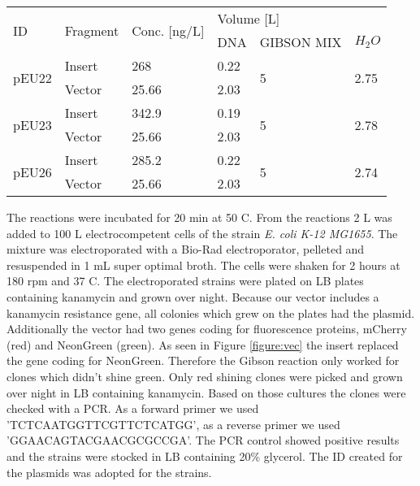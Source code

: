 \begin{table}[H]
	\begin{tabular}{|llllll|}
		\hline
		\multirow{2}{*}{ID}    & \multirow{2}{*}{Fragment} & \multirow{2}{*}{Conc. [ng/\textmu L]} & \multicolumn{3}{l|}{Volume [\textmu L]}           \\
		&                           &                                       & DNA  & GIBSON MIX         & $H_2O$                  \\ \hline
		\multirow{2}{*}{pEU22} & Insert                    & 268                                   & 0.22 & \multirow{2}{*}{5} & \multirow{2}{*}{2.75} \\
		& Vector                    & 25.66                                 & 2.03 &                    &                       \\ \hline
		\multirow{2}{*}{pEU23} & Insert                    & 342.9                                 & 0.19 & \multirow{2}{*}{5} & \multirow{2}{*}{2.78} \\
		& Vector                    & 25.66                                 & 2.03 &                    &                       \\ \hline
		\multirow{2}{*}{pEU26} & Insert                     & 285.2                                 & 0.22 & \multirow{2}{*}{5} & \multirow{2}{*}{2.74} \\
		& Vector                    & 25.66                                 & 2.03 &                    &                       \\ \hline
	\end{tabular}
\end{table}
The reactions were incubated for 20 min at 50 \degree C. From the reactions 2 \textmu L was added to 100 \textmu L electrocompetent cells of the strain \textit{E. coli K-12 MG1655}. The mixture was electroporated with a Bio-Rad electroporator, pelleted and resuspended in 1 mL super optimal broth. The cells were shaken for 2 hours at 180 rpm and 37 \degree C. The electroporated strains were plated on LB plates containing kanamycin  and grown over night. Because our vector includes a kanamycin resistance gene, all colonies which grew on the plates had the plasmid.  Additionally the vector had two genes coding for fluorescence proteins, mCherry (red) and NeonGreen (green). As seen in Figure \ref{figure:vec} the insert replaced the gene coding for NeonGreen. Therefore the Gibson reaction only worked for clones which didn't shine green. Only red shining clones were picked and grown over night in LB containing kanamycin. Based on those cultures the clones were checked with a PCR. As a forward primer we used 'TCTCAATGGTTCGTTCTCATGG', as a reverse primer we used 'GGAACAGTACGAACGCGCCGA'. The PCR control showed positive results and the strains were stocked in LB containing 20\% glycerol.
The ID created for the plasmids was adopted for the strains. 

